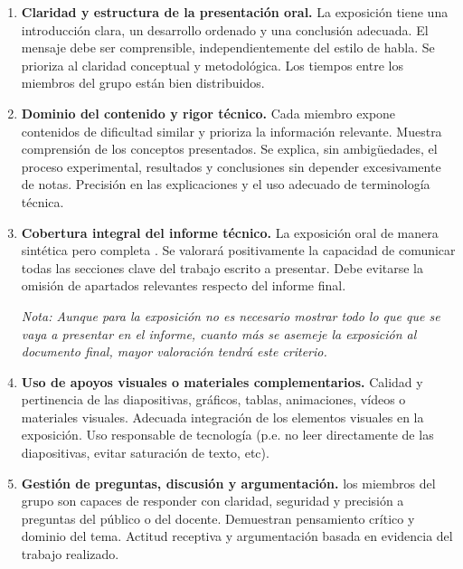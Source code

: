 \documentclass[a4paper, 11pt]{article}
\begin{document}
\begin{enumerate}
\item \textbf{Claridad y estructura de la presentación oral.} La exposición tiene una introducción clara, un desarrollo ordenado y una conclusión adecuada. El mensaje debe ser comprensible, independientemente del estilo de habla. Se prioriza al claridad conceptual y metodológica. Los tiempos entre los miembros del grupo están bien distribuidos.

\item \textbf{Dominio del contenido y rigor técnico.} Cada miembro expone contenidos de dificultad similar y prioriza la información relevante. Muestra comprensión de los conceptos presentados. Se explica, sin ambigüedades, el proceso experimental, resultados y conclusiones sin depender excesivamente de notas. Precisión en las explicaciones y el uso adecuado de terminología técnica.

\item \textbf{Cobertura integral del informe técnico.} La exposición oral  de manera sintética pero completa . Se valorará positivamente la capacidad de comunicar todas las secciones clave del trabajo escrito a presentar. Debe evitarse la omisión de apartados relevantes respecto del informe final. 

\textit{Nota: Aunque para la exposición no es necesario mostrar todo lo que que se vaya a presentar en el informe, cuanto más se asemeje la exposición al documento final, mayor valoración tendrá este criterio.}

\item \textbf{Uso de apoyos visuales o materiales complementarios.} Calidad y pertinencia de las diapositivas, gráficos, tablas, animaciones, vídeos o materiales visuales. Adecuada integración de los elementos visuales en la exposición. Uso responsable de tecnología (p.e. no leer directamente de las diapositivas, evitar saturación de texto, etc).

\item \textbf{Gestión de preguntas, discusión y argumentación.}  los miembros del grupo son capaces de responder con claridad, seguridad y precisión a preguntas del público o del docente. Demuestran pensamiento crítico y dominio del tema. Actitud receptiva y argumentación basada en evidencia del trabajo realizado.
\end{enumerate}
\end{document}
